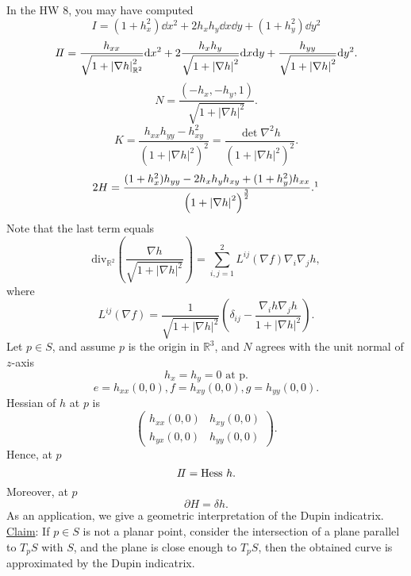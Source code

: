 In the HW 8, you may have computed 
\[
    I=\left(1+h_x^2\right)\dd x^2+2h_x h_y\dd x\dd y+(1+h_y^2)\dd y^2
\]
\[
    I\!I =\frac{h_{xx}}{\sqrt{1+\left|\nabla h\right|_{\mathbb{R}^2}^2}}
    \dd x^2 +2 \frac{h_{x}h_y}{\sqrt{1+\left|\nabla h
    \right|^2}}\dd x\dd y+\frac{h_{yy}}{\sqrt{1+\left|
        \nabla h\right|^2}}\dd y^2.
\]
\[
N=\frac{\left(-h_x,-h_y,1\right)}{\sqrt{1+\left|
    \nabla h\right|^2}}.    
\]
\[
    K=\frac{h_{xx}h_{yy}-h_{xy}^2}{\left(1+\left|
        \nabla h\right|^2\right)^2}=\frac{\det \nabla^2h}{\left(1+\left|
            \nabla h\right|^2\right)^2}.
\]
\[
    2H=\frac{(1+h_x^2)h_{yy}-2 h_x h_y h_{xy}+(1+h_y^2)h_{xx}}{
        \left(1+\left|
            \nabla h\right|^2\right)^{\frac{3}{2}}
    }    .
    \footnotemark
\]
Note that the last term equals \[
    \mathrm{div}_{\mathbb{R}^2}\left(\frac{\nabla h}{
        \sqrt{1+\left|
            \nabla h\right|^2}
    }\right)
    =
    \sum_{i,j=1}^2 L^{ij}\left(\nabla f\right)\nabla_i\nabla_j h,
\]
where \[
    L^{ij}\left(\nabla f\right)=\frac{1}{\sqrt{1+\left|
        \nabla h\right|^2}}\left(\delta_{ij}-
        \frac{\nabla_i h\nabla_j h}{1+\left|
            \nabla h\right|^2}\right)    .
\]
Let \(p\in S\), and assume \(p\) is the origin in \(\mathbb{R}^3\),
 and \(N\) agrees with the unit normal of \(z\)-axis
 \[
    h_x=h_y=0\text{ at p}.   
 \]
 \[
    e=h_{xx}(0,0), f=h_{xy}(0,0), g=h_{yy}(0,0).   
 \]
 Hessian of \(h\) at \(p\) is 
 \[
    \begin{pmatrix}
        h_{xx}(0,0)& h_{xy}(0,0)\\
        h_{yx}(0,0)&h_{yy}(0,0)
    \end{pmatrix} .  
 \]
 Hence, at \(p\)
 \[
    I\!I=\mathrm{Hess}~h.   
 \]
 Moreover, at \(p\)
 \[
    \partial H=\delta h.
 \]
 As an application, we give a geometric interpretation of the Dupin
 indicatrix.
 \underline{Claim}: If \(p\in S\) is not a planar point, consider the 
 intersection of a plane parallel to \(T_p S\) with \(S\), and the plane
  is close enough to \(T_p S\), then the obtained curve is approximated
   by the Dupin indicatrix.
